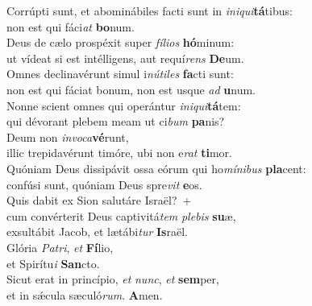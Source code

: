 \evenverse Corrúpti sunt, et abominábiles facti sunt in \textit{i}\textit{ni}\textit{qui}\textbf{tá}tibus:~\*\\
\evenverse non est qui fáci\textit{at} \textbf{bo}num.\\
\oddverse Deus de cælo prospéxit super \textit{fí}\textit{li}\textit{os} \textbf{hó}minum:~\*\\
\oddverse ut vídeat si est intélligens, aut requí\textit{rens} \textbf{De}um.\\
\evenverse Omnes declinavérunt simul i\textit{nú}\textit{ti}\textit{les} \textbf{fa}cti sunt:~\*\\
\evenverse non est qui fáciat bonum, non est usque \textit{ad} \textbf{u}num.\\
\oddverse Nonne scient omnes qui operántur \textit{i}\textit{ni}\textit{qui}\textbf{tá}tem:~\*\\
\oddverse qui dévorant plebem meam ut ci\textit{bum} \textbf{pa}nis?\\
\evenverse Deum non \textit{in}\textit{vo}\textit{ca}\textbf{vé}runt,~\*\\
\evenverse illic trepidavérunt timóre, ubi non e\textit{rat} \textbf{ti}mor.\\
\oddverse Quóniam Deus dissipávit ossa eórum qui ho\textit{mí}\textit{ni}\textit{bus} \textbf{pla}cent:~\*\\
\oddverse confúsi sunt, quóniam Deus spre\textit{vit} \textbf{e}os.\\
\evenverse Quis dabit ex Sion salutáre Israël?~+\\
\evenverse  cum convérterit Deus captivitá\textit{tem} \textit{ple}\textit{bis} \textbf{su}æ,~\*\\
\evenverse exsultábit Jacob, et lætábi\textit{tur} \textbf{Is}raël.\\
\oddverse Glória \textit{Pa}\textit{tri}, \textit{et} \textbf{Fí}lio,~\*\\
\oddverse et Spirítu\textit{i} \textbf{San}cto.\\
\evenverse Sicut erat in princípio, \textit{et} \textit{nunc}, \textit{et} \textbf{sem}per,~\*\\
\evenverse et in sǽcula sæculó\textit{rum}. \textbf{A}men.\\

